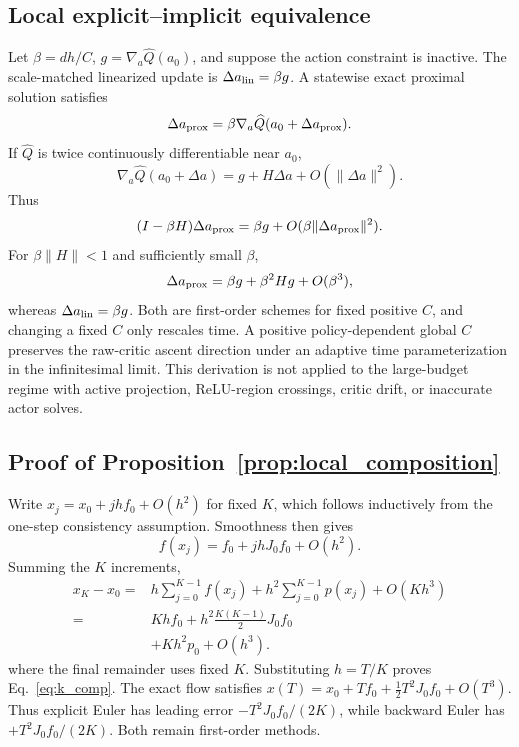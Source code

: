 \documentclass[letterpaper]{article}
\begin{document}
\subsection{Local explicit--implicit equivalence}
Let $\beta=dh/C$, $g=\nabla_a\widehat Q(a_0)$, and suppose the action
constraint is inactive. The scale-matched linearized update is
$\Delta a_{\rm lin}=\beta g$. A statewise exact proximal solution satisfies
\begin{equation}
\Delta a_{\rm prox}
=\beta\nabla_a\widehat Q(a_0+\Delta a_{\rm prox}).
\end{equation}
If $\widehat Q$ is twice continuously differentiable near $a_0$,
\begin{equation}
\nabla_a\widehat Q(a_0+\Delta a)
=g+H\Delta a+O(\|\Delta a\|^2).
\end{equation}
Thus
\begin{equation}
(I-\beta H)\Delta a_{\rm prox}
=\beta g+O(\beta\|\Delta a_{\rm prox}\|^2).
\end{equation}
For $\beta\|H\|<1$ and sufficiently small $\beta$,
\begin{equation}
\Delta a_{\rm prox}=\beta g+\beta^2Hg+O(\beta^3),
\end{equation}
whereas $\Delta a_{\rm lin}=\beta g$. Both are first-order schemes for fixed
positive $C$, and changing a fixed $C$ only rescales time. A positive
policy-dependent global $C$ preserves the raw-critic ascent direction under an
adaptive time parameterization in the infinitesimal limit. This derivation is
not applied to the large-budget regime with active projection, ReLU-region
crossings, critic drift, or inaccurate actor solves.

\subsection{Proof of Proposition~\ref{prop:local_composition}}
Write $x_j=x_0+jhf_0+O(h^2)$ for fixed $K$, which follows inductively from the
one-step consistency assumption. Smoothness then gives
\begin{equation}
f(x_j)=f_0+jhJ_0f_0+O(h^2).
\end{equation}
Summing the $K$ increments,
\begin{equation}
\begin{aligned}
x_K-x_0
={}&h\sum_{j=0}^{K-1}f(x_j)
+h^2\sum_{j=0}^{K-1}p(x_j)+O(Kh^3)\\
={}&Khf_0+h^2\frac{K(K-1)}{2}J_0f_0\\
&+Kh^2p_0+O(h^3).
\end{aligned}
\end{equation}
where the final remainder uses fixed $K$. Substituting $h=T/K$ proves
Eq.~\eqref{eq:k_comp}. The exact flow satisfies
$x(T)=x_0+Tf_0+\tfrac12T^2J_0f_0+O(T^3)$. Thus explicit Euler has leading
error $-T^2J_0f_0/(2K)$, while backward Euler has
$+T^2J_0f_0/(2K)$. Both remain first-order methods.
\end{document}
